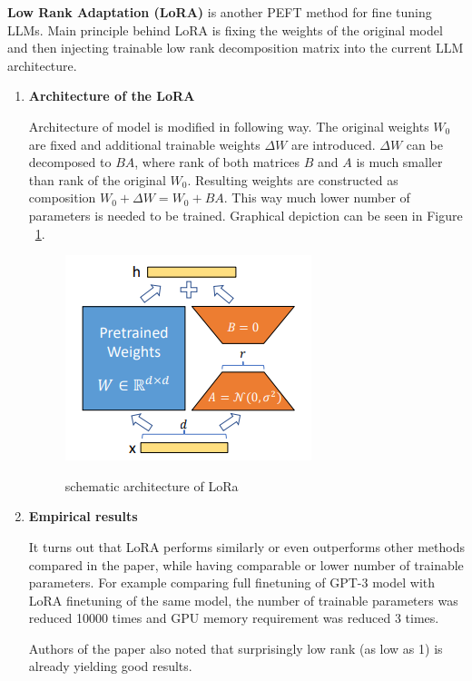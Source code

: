 \textbf{Low Rank Adaptation (LoRA)} \cite{hu2021lora} is another PEFT method for fine tuning LLMs. Main principle behind LoRA is fixing the weights of the original model and then injecting trainable low rank decomposition matrix into the current LLM architecture. 

\begin{enumerate}
    \item \textbf{Architecture of the LoRA}

    Architecture of model is modified in following way. The original weights $W_{0}$ are fixed and additional trainable weights $\Delta W$ are introduced. $\Delta W$ can be decomposed to $BA$, where rank of both matrices $B$ and $A$ is much smaller than rank of the original $W_{0}$. Resulting weights are constructed as composition $W_{0} + \Delta W = W_{0} + BA$. This way much lower number of parameters is needed to be trained. Graphical depiction can be seen in Figure ~\ref{fig:LoRA}.

    \begin{figure}[h!]
        \centering
        {\includegraphics[scale=0.9]{imgs/LoRA.png}}
        \caption{schematic architecture of LoRa \cite{hu2021lora}}
        \label{fig:LoRA}
    \end{figure}
    
    \item \textbf{Empirical results}
    
    It turns out that LoRA performs similarly or even outperforms other methods compared in the paper, while having comparable or lower number of trainable parameters.
    For example comparing full finetuning of GPT-3 model with LoRA finetuning of the same model, the number of trainable parameters was reduced 10000 times and GPU memory requirement was reduced 3 times.
    
    Authors of the paper also noted that surprisingly low rank (as low as 1) is already yielding good results.
    

\end{enumerate}
